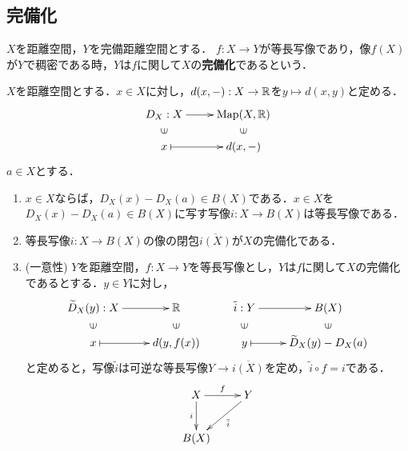\documentclass[uplatex,dvipdfmx]{jsreport}
\begin{document}
\subsection{完備化}

\begin{definition}[completion]
    $X$を距離空間，$Y$を完備距離空間とする．
    $f:X\to Y$が等長写像であり，像$f(X)$が$Y$で稠密である時，$Y$は$f$に関して$X$の\textbf{完備化}であるという．
\end{definition}

\begin{proposition}
    $X$を距離空間とする．$x\in X$に対し，$d(x,-):X\to\mathbb{R}$を$y\mapsto d(x,y)$と定める．
    \[\xymatrix@R-2pc{
        D_X:X\ar[r]&\Map(X,\R)\\
        \rotatebox[origin=c]{90}{$\in$}&\rotatebox[origin=c]{90}{$\in$}\\
        x\ar@{|->}[r]&d(x,-)
    }\]
    $a\in X$とする．
    \begin{enumerate}
        \item $x\in X$ならば，$D_X(x)-D_X(a)\in B(X)$である．$x\in X$を$D_X(x)-D_X(a)\in B(X)$に写す写像$i:X\to B(X)$は等長写像である．
        \item 等長写像$i:X\to B(X)$の像の閉包$\overline{i(X)}$が$X$の完備化である．
        \item (一意性) $Y$を距離空間，$f:X\to Y$を等長写像とし，$Y$は$f$に関して$X$の完備化であるとする．$y\in Y$に対し，
        \[\xymatrix@R-2pc{
            \widetilde{D}_X(y):X\ar[r]&\R&\tilde{i}:Y\ar[r]&B(X)\\
            \rotatebox[origin=c]{90}{$\in$}&\rotatebox[origin=c]{90}{$\in$}&\rotatebox[origin=c]{90}{$\in$}&\rotatebox[origin=c]{90}{$\in$}\\
            x\ar@{|->}[r]&d(y,f(x))&y\ar@{|->}[r]&\widetilde{D}_X(y)-D_X(a)
        }\]
        と定めると，写像$\tilde{i}$は可逆な等長写像$Y\to\overline{i(X)}$を定め，$\tilde{i}\circ f=i$である．
        \[\xymatrix{
            X\ar[r]^-f\ar[d]_-i&Y\ar[dl]^-{\o{i}}\\
            B(X)
        }\]
    \end{enumerate}
\end{proposition}
\end{document}

